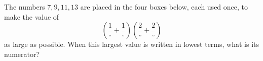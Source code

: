 The numbers $7,9,11,13$ are placed in the four boxes below, each used once, to make the value of
\[\left(\dfrac{1}{\square}+\dfrac{1}{\square}\right)\left(\dfrac{2}{\square}+\dfrac{2}{\square}\right)\]
as large as possible. When this largest value is written in lowest terms, what is its numerator?
